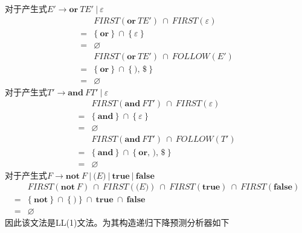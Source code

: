 \documentclass{article}
\begin{document}
对于产生式$E' \rightarrow \textbf{or}\ TE'\ |\ \varepsilon$
\begin{align*}
    &FIRST(\textbf{or}\ TE') \ \cap \  FIRST(\varepsilon) \\ =& \big\{\ \textbf{or}\ \big\} \ \cap \  \big\{\ \varepsilon\ \big\} \\
    =& \varnothing
    \\
    &FIRST(\textbf{or}\ TE') \ \cap \  FOLLOW(E') \\
    =& \big\{\ \textbf{or}\ \big\} \ \cap \  \big\{\ \texttt{)},\,\texttt{\$}\ \big\} \\
    =& \varnothing
\end{align*}
对于产生式$T' \rightarrow \textbf{and}\ FT'\ |\ \varepsilon$
\begin{align*}
    &FIRST(\textbf{and}\ FT') \ \cap \  FIRST(\varepsilon) \\ =& \big\{\ \textbf{and}\ \big\} \ \cap \  \big\{\ \varepsilon\ \big\} \\
    =& \varnothing
    \\
    &FIRST(\textbf{and}\ FT') \ \cap \  FOLLOW(T') \\ =& \big\{\ \textbf{and}\ \big\} \ \cap \  \big\{\ \textbf{or},\,\texttt{)},\,\texttt{\$}\ \big\} \\
    =& \varnothing
\end{align*}
对于产生式$F \rightarrow \textbf{not}\ F\ |\ \texttt{(}E\texttt{)}\ |\ \textbf{true}\ |\ \textbf{false}$
\begin{align*}
    &FIRST(\textbf{not}\ F) \ \cap \  FIRST(\texttt{(}E\texttt{)}) \ \cap \  FIRST(\textbf{true}) \ \cap \  FIRST(\textbf{false}) \\ = &\big\{\ \textbf{not}\ \big\} \ \cap \  \big\{\ \texttt{)}\ \big\} \ \cap \  \textbf{true} \ \cap \  \textbf{false}\\
    =& \varnothing
\end{align*}
因此该文法是LL(1)文法。为其构造递归下降预测分析器如下
\end{document}
